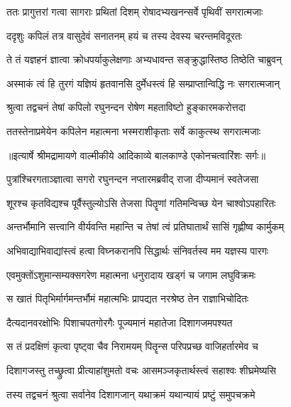 \twolineshloka
{ततः प्रागुत्तरां गत्वा सागराः प्रथितां दिशम्}
{रोषादभ्यखनन्सर्वे पृथिवीं सगरात्मजाः} %

\twolineshloka
{ददृशुः कपिलं तत्र वासुदेवं सनातनम्}
{हयं च तस्य देवस्य चरन्तमविदूरतः} %

\twolineshloka
{ते तं यज्ञहनं ज्ञात्वा क्रोधपर्याकुलेक्षणाः}
{अभ्यधावन्त सङ्क्रुद्धास्तिष्ठ तिष्ठेति चाब्रुवन्} %

\twolineshloka
{अस्माकं त्वं हि तुरगं यज्ञियं हृतवानसि}
{दुर्मेधस्त्वं हि सम्प्राप्तान्विद्धि नः सगरात्मजान्} %

\twolineshloka
{श्रुत्वा तद्वचनं तेषां कपिलो रघुनन्दन}
{रोषेण महताविष्टो हुङ्कारमकरोत्तदा} %

\twolineshloka
{ततस्तेनाप्रमेयेन कपिलेन महात्मना}
{भस्मराशीकृताः सर्वे काकुत्स्थ सगरात्मजाः} %


{॥इत्यार्षे श्रीमद्रामायणे वाल्मीकीये आदिकाव्ये बालकाण्डे एकोनचत्वारिंशः सर्गः॥}


\twolineshloka
{पुत्रांश्चिरगताञ्ज्ञात्वा सगरो रघुनन्दन}
{नप्तारमब्रवीद् राजा दीप्यमानं स्वतेजसा} %

\twolineshloka
{शूरश्च कृतविद्यश्च पूर्वैस्तुल्योऽसि तेजसा}
{पितॄणां गतिमन्विच्छ येन चाश्वोऽपहारितः} %

\twolineshloka
{अन्तर्भौमानि सत्त्वानि वीर्यवन्ति महान्ति च}
{तेषां त्वं प्रतिघातार्थं सासिं गृह्णीष्व कार्मुकम्} %

\twolineshloka
{अभिवाद्याभिवाद्यांस्त्वं हत्वा विघ्नकरानपि}
{सिद्धार्थः संनिवर्तस्व मम यज्ञस्य पारगः} %

\twolineshloka
{एवमुक्तोंऽशुमान्सम्यक्सगरेण महात्मना}
{धनुरादाय खड्गं च जगाम लघुविक्रमः} %

\twolineshloka
{स खातं पितृभिर्मार्गमन्तर्भौमं महात्मभिः}
{प्रापद्यत नरश्रेष्ठ तेन राज्ञाभिचोदितः} %

\twolineshloka
{दैत्यदानवरक्षोभिः पिशाचपतगोरगैः}
{पूज्यमानं महातेजा दिशागजमपश्यत} %

\twolineshloka
{स तं प्रदक्षिणं कृत्वा पृष्ट्वा चैव निरामयम्}
{पितॄन्स परिपप्रच्छ वाजिहर्तारमेव च} %

\twolineshloka
{दिशागजस्तु तच्छ्रुत्वा प्रीत्याहांशुमतो वचः}
{आसमञ्जकृतार्थस्त्वं सहाश्वः शीघ्रमेष्यसि} %

\twolineshloka
{तस्य तद्वचनं श्रुत्वा सर्वानेव दिशागजान्}
{यथाक्रमं यथान्यायं प्रष्टुं समुपचक्रमे} %


